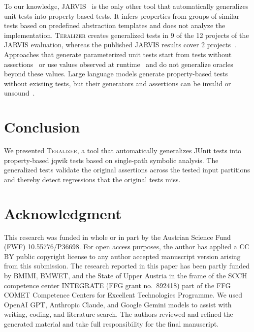 \documentclass[10pt,conference]{IEEEtran}
\newcommand{\Teralizer}{\textsc{Teralizer}}
\begin{document}
To our knowledge, JARVIS~\cite{peleg_2018_jarvis} is the only other tool that automatically generalizes unit tests into property-based tests.
It infers properties from groups of similar tests based on predefined abstraction templates and does not analyze the implementation.
\Teralizer{} creates generalized tests in 9 of the 12 projects of the JARVIS evaluation, whereas the published JARVIS results cover 2 projects~\cite{glock_2025_teralizer}.
Approaches that generate parameterized unit tests start from tests without assertions~\cite{fraser_2011_generating_put} or use values observed at runtime~\cite{tiwari_2024_proze} and do not generalize oracles beyond these values.
Large language models generate property-based tests without existing tests, but their generators and assertions can be invalid or unsound~\cite{vikram_2024_pbt}.

\section{Conclusion}
\label{sec:conclusion}

We presented \Teralizer{}, a tool that automatically generalizes JUnit tests into property-based jqwik tests based on single-path symbolic analysis.
The generalized tests validate the original assertions across the tested input partitions and thereby detect regressions that the original tests miss.

\section*{Acknowledgment}
This research was funded in whole or in part by the Austrian Science Fund (FWF) 10.55776/P36698.
For open access purposes, the author has applied a CC BY public copyright license to any author accepted manuscript version arising from this submission.
The research reported in this paper has been partly funded by BMIMI, BMWET, and the State of Upper Austria in the frame of the SCCH competence center INTEGRATE (FFG grant no.~892418) part of the FFG COMET Competence Centers for Excellent Technologies Programme.
We used OpenAI GPT, Anthropic Claude, and Google Gemini models to assist with writing, coding, and literature search.
The authors reviewed and refined the generated material and take full responsibility for the final manuscript.



\end{document}
